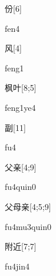 \begin{verbete}[fen4]{份}[6]
\begin{pronuncia}{fen4}
\end{pronuncia}
\end{verbete}

\begin{verbete}[feng1]{风}[4]
\begin{pronuncia}{feng1}
\end{pronuncia}
\end{verbete}

\begin{verbete}[feng1ye4]{枫叶}[8;5]
\begin{pronuncia}{feng1ye4}
\end{pronuncia}
\end{verbete}

\begin{verbete}[fu4]{副}[11]
\begin{pronuncia}{fu4}
\end{pronuncia}
\end{verbete}

\begin{verbete}[fu4qin0]{父亲}[4;9]
\begin{pronuncia}{fu4quin0}
\end{pronuncia}
\end{verbete}

\begin{verbete}[fu4mu3qin0]{父母亲}[4;5;9]
\begin{pronuncia}{fu4mu3quin0}
\end{pronuncia}
\end{verbete}

\begin{verbete}[fu4jin4]{附近}[7;7]
\begin{pronuncia}{fu4jin4}
\end{pronuncia}
\end{verbete}

